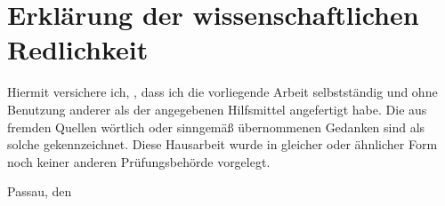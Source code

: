 \newpage
\section*{Erklärung der wissenschaftlichen Redlichkeit}

Hiermit versichere ich, \theauthor, dass ich die
vorliegende Arbeit selbstständig und ohne Benutzung anderer
als der angegebenen Hilfsmittel angefertigt habe. Die aus
fremden Quellen wörtlich oder sinngemäß übernommenen Gedanken
sind als solche gekennzeichnet. Diese Hausarbeit wurde
in gleicher oder ähnlicher Form noch keiner anderen
Prüfungsbehörde vorgelegt.

\vspace*{1cm}

Passau, den \thedate\\[0.5cm]
\hspace{0.5cm} \makebox[4cm]{\hrulefill}\\
\theauthor